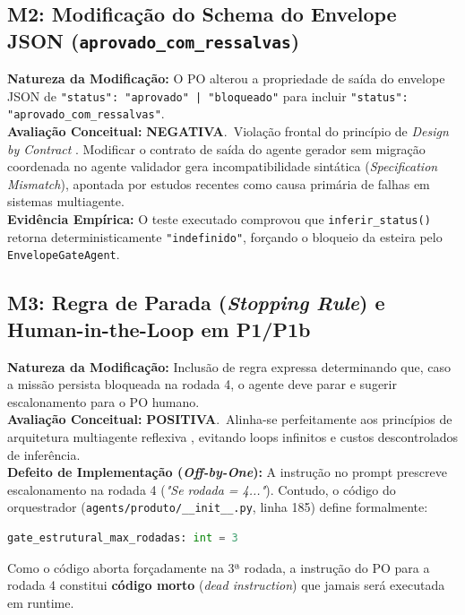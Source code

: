 \documentclass[11pt,a4paper]{article}
\begin{document}
\subsection{M2: Modificação do Schema do Envelope JSON (\texttt{aprovado\_com\_ressalvas})}
\textbf{Natureza da Modificação:} O PO alterou a propriedade de saída do envelope JSON de \texttt{"status": "aprovado" | "bloqueado"} para incluir \texttt{"status": "aprovado\_com\_ressalvas"}.\\
\textbf{Avaliação Conceitual:} \color{DarkRed}\textbf{NEGATIVA}.\normalfont\ Violação frontal do princípio de \textit{Design by Contract} \cite{meyer1992applying}. Modificar o contrato de saída do agente gerador sem migração coordenada no agente validador gera incompatibilidade sintática (\textit{Specification Mismatch}), apontada por estudos recentes \cite{wu2023autogen,hong2024metagpt} como causa primária de falhas em sistemas multiagente.\\
\textbf{Evidência Empírica:} O teste executado comprovou que \texttt{inferir\_status()} retorna deterministicamente \texttt{"indefinido"}, forçando o bloqueio da esteira pelo \texttt{EnvelopeGateAgent}.

\subsection{M3: Regra de Parada (\textit{Stopping Rule}) e Human-in-the-Loop em P1/P1b}
\textbf{Natureza da Modificação:} Inclusão de regra expressa determinando que, caso a missão persista bloqueada na rodada 4, o agente deve parar e sugerir escalonamento para o PO humano.\\
\textbf{Avaliação Conceitual:} \color{DarkGreen}\textbf{POSITIVA}.\normalfont\ Alinha-se perfeitamente aos princípios de arquitetura multiagente reflexiva \cite{shinn2023reflexion,madaan2023selfrefine}, evitando loops infinitos e custos descontrolados de inferência.\\
\textbf{Defeito de Implementação (\textit{Off-by-One}):} A instrução no prompt prescreve escalonamento na rodada 4 (\textit{"Se rodada = 4..."}). Contudo, o código do orquestrador (\texttt{agents/produto/\_\_init\_\_.py}, linha 185) define formalmente:
\begin{lstlisting}[language=Python]
gate_estrutural_max_rodadas: int = 3
\end{lstlisting}
Como o código aborta forçadamente na 3ª rodada, a instrução do PO para a rodada 4 constitui \textbf{código morto} (\textit{dead instruction}) que jamais será executada em runtime.
\end{document}
